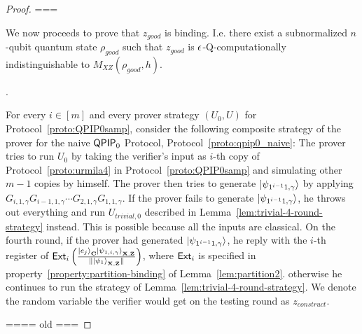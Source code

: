 \begin{proof}
===

We now proceeds to prove that $z_{good}$ is binding. I.e. there exist a subnormalized $n$-qubit quantum state $\rho_{good}$ such that $z_{good}$ is $\epsilon$-Q-computationally indistinguishable to $M_{XZ}(\rho_{good},h)$.

.


For every $i\in [m]$ and every prover strategy $(U_0,U)$ for Protocol~\ref{proto:QPIP0samp}, consider the following composite strategy of the prover for the naive $\operatorname{\mathsf{QPIP}}_0$ Protocol, Protocol~\ref{proto:qpip0_naive}: The prover tries to run $U_0$ by taking the verifier's input as $i$-th copy of Protocol~\ref{proto:urmila4} in Protocol~\ref{proto:QPIP0samp} and simulating other $m-1$ copies by himself. The prover then   tries to generate $\ket{\psi_{1^{i-1}1,\gamma}}$ by applying $G_{i,1,\gamma}G_{i-1,1,\gamma} \cdots G_{2,1,\gamma}G_{1,1,\gamma}$. If the prover fails to generate $\ket{\psi_{1^{i-1}1,\gamma}}$, he throws out everything and run $U_{trivial,0}$ described  in  Lemma~\ref{lem:trivial-4-round-strategy} instead. This is possible because all the inputs are classical. On the fourth round, if the prover had generated $\ket{\psi_{1^{i-1}1,\gamma}}$, he reply with the $i$-th register of $\mathsf{Ext}_i\left(\frac{\ket{e_j}_{\mathbf{C}}\ket{\psi_{1,i,\gamma}}_{\mathbf{X},\mathbf{Z}}}{\|\ket{\psi_1}_{\mathbf{X},\mathbf{Z}}\|}\right)$, where $\mathsf{Ext}_i$ is specified in property~\ref{property:partition-binding} of Lemma~\ref{lem:partition2}. otherwise he continues to run the strategy of Lemma~\ref{lem:trivial-4-round-strategy}. We denote the random variable the verifier would get on the testing round as $z_{construct}$.


==== old ===



\end{proof}
